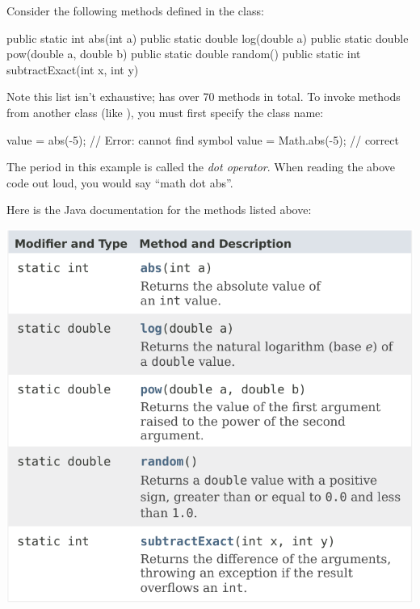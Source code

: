 
Consider the following methods defined in the  class:

\begin{javalst}
    public static int abs(int a)
    public static double log(double a)
    public static double pow(double a, double b)
    public static double random()
    public static int subtractExact(int x, int y)
\end{javalst}

Note this list isn't exhaustive;  has over 70 methods in total.
To invoke methods from another class (like ), you must first specify the class name:

\begin{javalst}
    value = abs(-5);       // Error: cannot find symbol
    value = Math.abs(-5);  // correct
\end{javalst}

The period in this example is called the \emph{dot operator}. When reading the above code out loud, you would say ``math dot abs''.

Here is the Java documentation for the methods listed above:
\nopagebreak
\begin{center}
\includegraphics[scale=0.90]{math-javadoc.pdf}
\end{center}




